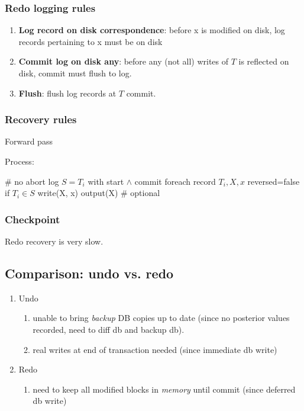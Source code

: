 \documentclass[a4paper]{report}
\begin{document}
\subsubsection{Redo logging rules}
\begin{enumerate}
\item \textbf{Log record on disk  correspondence}: before x is modified on disk, log records pertaining to x must be on disk
\item \textbf{Commit log on disk  any}: before any (not all) writes of $T$ is reflected on disk, commit must flush to log.
\item \textbf{Flush}: flush log records at $T$ commit. 
\end{enumerate}

\subsubsection{Recovery rules}
Forward pass

Process: 
\begin{pseudo}
# no abort log
$S = T_i$ with start $\wedge$ commit
foreach record $T_i, X, x$ reversed=false
  if $T_i \in S$
    write(X, x)
    output(X) # optional
\end{pseudo}

\subsubsection{Checkpoint}
Redo recovery is very slow. 

\subsection*{Comparison: undo vs. redo }
\begin{enumerate}
\item Undo
\begin{enumerate}
\item unable to bring \textit{backup} DB copies up to date (since no posterior values recorded, need to diff db and backup db).
\item real writes at end of transaction needed (since immediate db write)
\end{enumerate}
\item Redo
\begin{enumerate}
\item need to keep all modified blocks in \textit{memory} until commit (since deferred db write)
\end{enumerate}
\end{enumerate}
\end{document}
